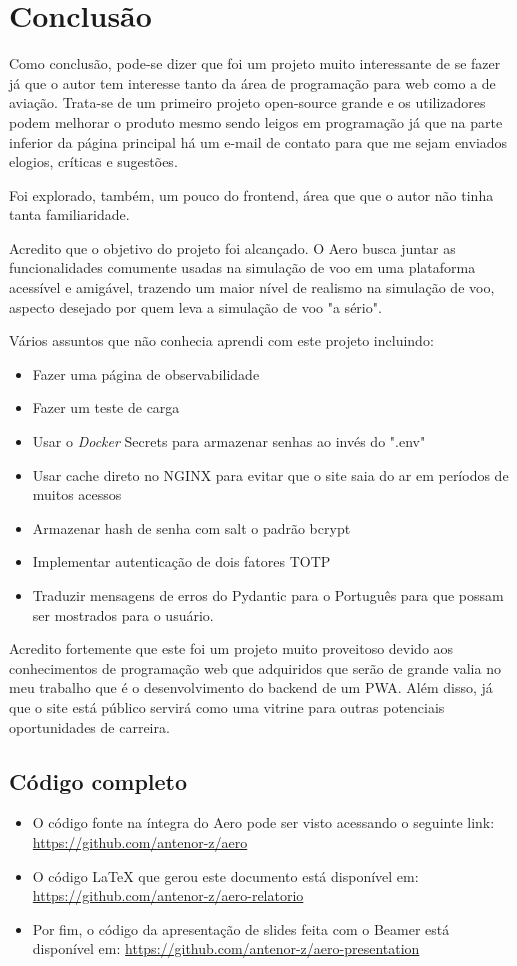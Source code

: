 \chapter{Conclusão}

Como conclusão, pode-se dizer que foi um projeto muito interessante de se fazer já que 
o autor tem interesse tanto da área de programação para web como a de aviação. Trata-se
de um primeiro 
projeto open-source grande e os utilizadores podem melhorar o produto mesmo sendo
leigos em programação já que na parte inferior da página principal há um e-mail 
de contato para que me sejam enviados elogios, críticas e sugestões.

Foi explorado, também, um pouco do frontend, área que que o autor não tinha tanta 
familiaridade.

Acredito que o objetivo do projeto foi alcançado. O Aero busca juntar as funcionalidades 
comumente usadas na simulação de voo em uma plataforma acessível e amigável, 
trazendo um maior nível de realismo na simulação de voo, aspecto desejado por quem leva
a simulação de voo "a sério".

Vários assuntos que não conhecia aprendi com este projeto incluindo:

\begin{itemize}
\item Fazer uma página de observabilidade
\item Fazer um teste de carga
\item Usar o \textit{Docker} Secrets para armazenar senhas ao invés do ".env"
\item Usar cache direto no NGINX para evitar que o site saia do ar em períodos 
de muitos acessos
\item Armazenar hash de senha com salt o padrão bcrypt
\item Implementar autenticação de dois fatores TOTP
\item Traduzir mensagens de erros do Pydantic para o Português para que possam 
ser mostrados para o usuário.
\end{itemize}

Acredito fortemente que este foi um projeto muito proveitoso devido aos 
conhecimentos de programação web que adquiridos que serão de grande valia no meu 
trabalho que é o desenvolvimento do backend de um PWA. Além disso, já que o site está público 
servirá como uma vitrine para outras potenciais oportunidades de carreira.

\section {Código completo}

\begin{itemize}
\item O código fonte na íntegra do Aero pode ser visto acessando o seguinte link: \url{https://github.com/antenor-z/aero}
\item O código LaTeX que gerou este documento está disponível em: \url{https://github.com/antenor-z/aero-relatorio}
\item Por fim, o código da apresentação de slides feita com o Beamer está disponível em: \url{https://github.com/antenor-z/aero-presentation}
\end{itemize}
